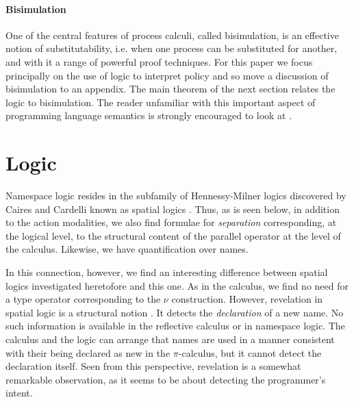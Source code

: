 \documentclass[]{amsart}
\theoremstyle{definition}
\theoremstyle{remark}
\numberwithin{equation}{subsection}
\newcommand{\pic}{$\pi$-calculus}
\begin{document}
\paragraph{Bisimulation}

One of the central features of process calculi, called bisimulation,
is an effective notion of substitutability, i.e. when one process can
be substituted for another, and with it a range of powerful proof
techniques. For this paper we focus principally on the use of logic to
interpret policy and so move a discussion of bisimulation to an
appendix. The main theorem of the next section relates the logic to
bisimulation. The reader unfamiliar with this important aspect of
programming language semantics is strongly encouraged to look at
\cite{DBLP:LNCS/Sangiorgi06}.

\section{Logic}
Namespace logic resides in the subfamily of Hennessy-Milner logics
discovered by Caires and Cardelli known as spatial logics
\cite{DBLP:conf/fossacs/Caires04}. Thus, as is seen below, in
addition to the action modalities, we also find formulae for
\emph{separation} corresponding, at the logical level, to the
structural content of the parallel operator at the level of the
calculus. Likewise, we have quantification over names. 

In this connection, however, we find an interesting difference between
spatial logics investigated heretofore and this one. As in the
calculus, we find no need for a type operator corresponding to the $\nu$
construction. However, revelation in spatial logic is a structural
notion \cite{DBLP:conf/fossacs/Caires04}. It detects the
\emph{declaration} of a new name. No such information is available in
the reflective calculus or in namespace logic. The calculus and the
logic can arrange that names are used in a manner consistent with
their being declared as new in the {\pic}, but it cannot detect the
declaration itself. Seen from this perspective, revelation is a
somewhat remarkable observation, as it seems to be about detecting the
programmer's intent.
\end{document}
